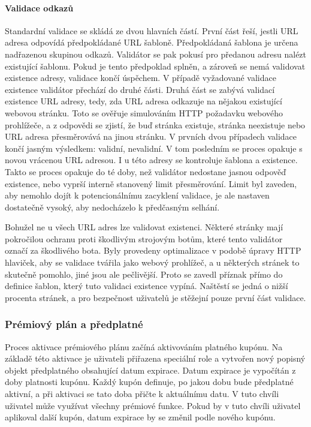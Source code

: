 			\paragraph{Validace odkazů}

			Standardní validace se skládá ze dvou hlavních částí.
			První část řeší, jestli \ac{URL} adresa odpovídá předpokládané \ac{URL} šabloně.
			Předpokládaná šablona je určena nadřazenou skupinou odkazů.
			Validátor se pak pokusí pro předanou adresu nalézt existující šablonu.
			Pokud je tento předpoklad splněn, a zároveň se nemá validovat existence adresy, validace končí úspěchem.
			V případě vyžadované validace existence validátor přechází do druhé části.
			Druhá část se zabývá validací existence \ac{URL} adresy, tedy, zda URL adresa odkazuje na nějakou existující
			webovou stránku.
			Toto se ověřuje simulováním \ac{HTTP} požadavku webového prohlížeče, a z odpovědi se zjistí, že buď stránka
			existuje, stránka neexistuje nebo \ac{URL} adresa přesměrovává na jinou stránku.
			V prvních dvou případech validace končí jasným výsledkem: validní, nevalidní.
			V tom posledním se proces opakuje s novou vrácenou \ac{URL} adresou.
			I u této adresy se kontroluje šablona a existence.
			Takto se proces opakuje do té doby, než validátor nedostane jasnou odpověď existence, nebo vyprší interně stanovený
			limit přesměrování.
			Limit byl zaveden, aby nemohlo dojít k potencionálnímu zacyklení validace,
			je ale nastaven dostatečně vysoký, aby nedocházelo k předčasným selhání.


			Bohužel ne u všech \ac{URL} adres lze validovat existenci.
			Některé stránky mají pokročilou ochranu proti škodlivým strojovým botům, které tento validátor označí za
			škodlivého bota.
			Byly provedeny optimalizace v podobě úpravy \ac{HTTP} hlaviček, aby se validace tvářila jako webový prohlížeč,
			a u některých stránek to skutečně pomohlo, jiné jsou ale pečlivější.
			Proto se zavedl příznak přímo do definice šablon, který tuto validaci existence vypíná.
			Naštěstí se jedná o nižší procenta stránek, a pro bezpečnost uživatelů je stěžejní pouze první část validace.

		\subsubsection{Prémiový plán a předplatné}

		Proces aktivace prémiového plánu začíná aktivováním platného kupónu.
		Na základě této aktivace je uživateli přiřazena speciální role a vytvořen nový popisný objekt předplatného
		obsahující datum expirace.
		Datum expirace je vypočítán z doby platnosti kupónu.
		Každý kupón definuje, po jakou dobu bude předplatné aktivní, a při aktivaci se tato doba přičte k aktuálnímu datu.
		V tuto chvíli uživatel může využívat všechny prémiové funkce.
		Pokud by v tuto chvíli uživatel aplikoval další kupón, datum expirace by se změnil podle nového kupónu.

